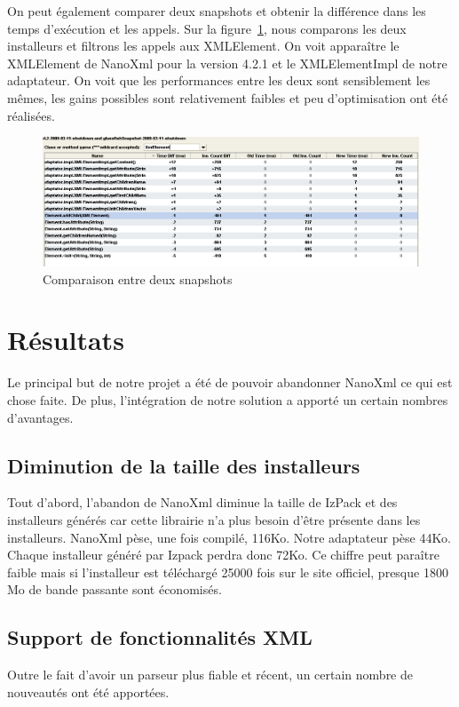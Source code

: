 On peut également comparer deux snapshots et obtenir la différence dans les temps d'exécution et les appels.
Sur la figure~\ref{fig:yourkitComparaison}, nous comparons les deux installeurs et filtrons les appels aux XMLElement.
On voit apparaître le XMLElement de NanoXml pour la version 4.2.1 et le XMLElementImpl de notre adaptateur.
On voit que les performances entre les deux sont sensiblement les mêmes, les gains possibles sont relativement faibles et peu d'optimisation ont été réalisées.
\begin{figure}[H]
	\centering
	\includegraphics[width=1\textwidth]{../image/yourkitComparaison.png}
	\caption{Comparaison entre deux snapshots}
	\label{fig:yourkitComparaison}
\end{figure}

\section{Résultats}
Le principal but de notre projet a été de pouvoir abandonner NanoXml ce qui est chose faite.
De plus, l'intégration de notre solution a apporté un certain nombres d'avantages.
\subsection{Diminution de la taille des installeurs}
Tout d'abord, l'abandon de NanoXml diminue la taille de IzPack et des installeurs générés car cette librairie n'a plus besoin d'être présente dans les installeurs.
NanoXml pèse, une fois compilé, 116Ko.
Notre adaptateur pèse 44Ko.
Chaque installeur généré par Izpack perdra donc 72Ko.
Ce chiffre peut paraître faible mais si l'installeur est téléchargé 25000 fois sur le site officiel, presque 1800 Mo de bande passante sont économisés.
\subsection{Support de fonctionnalités XML}
Outre le fait d'avoir un parseur plus fiable et récent, un certain nombre de nouveautés ont été apportées.
